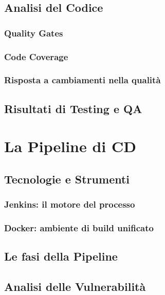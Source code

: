 \documentclass[a4paper,12pt]{report}
\begin{document}
	\section{Analisi del Codice}
	
	\subsection{Quality Gates}
	
	\subsection{Code Coverage}
	
	\subsection{Risposta a cambiamenti nella qualità}
	
	\section{Risultati di Testing e QA}
	
	\chapter{La Pipeline di CD}
	
	\section{Tecnologie e Strumenti}
	
	\subsection{Jenkins: il motore del processo}
	
	\subsection{Docker: ambiente di build unificato}
	
	\section{Le fasi della Pipeline}
	
	\section{Analisi delle Vulnerabilità}
	
\end{document}
